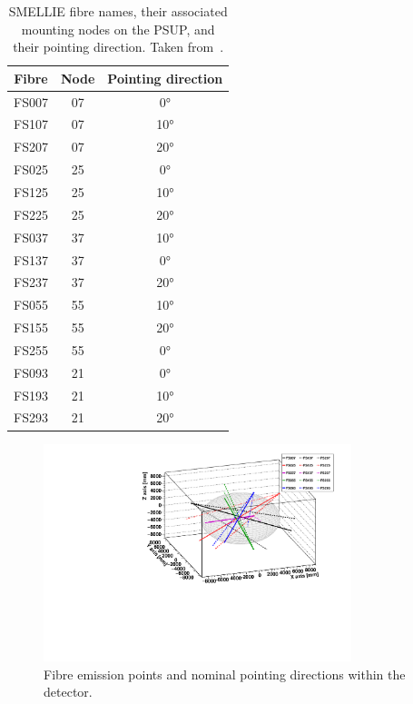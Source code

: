 \begin{table}
    \centering
    \begin{tabular}{c c c}
        \hline
        Fibre   & Node & Pointing direction \\ \hline \hline
        FS007   & 07   & \ang{0}  \\
        FS107   & 07   & \ang{10} \\
        FS207   & 07   & \ang{20} \\
        FS025   & 25   & \ang{0}  \\
        FS125   & 25   & \ang{10} \\
        FS225   & 25   & \ang{20} \\
        FS037   & 37   & \ang{10} \\
        FS137   & 37   & \ang{0}  \\
        FS237   & 37   & \ang{20} \\
        FS055   & 55   & \ang{10} \\
        FS155   & 55   & \ang{20} \\
        FS255   & 55   & \ang{0}  \\
        FS093   & 21   & \ang{0}  \\
        FS193   & 21   & \ang{10} \\
        FS293   & 21   & \ang{20} \\
        \hline
    \end{tabular}
    \caption[SMELLIE fibre names, their associated mounting nodes on the PSUP, and their pointing direction.]
    {SMELLIE fibre names, their associated mounting nodes on the PSUP, and their pointing direction. Taken from~\cite{turnerMeasurementScatteringCharacteristics2022}.}
    \label{tab:smellie_fibre_labellings}
\end{table}

\begin{figure}
    \centering
    \includegraphics[width=0.8\textwidth]{3_SMELLIEHardware/images/fibre_positions.pdf}
    \caption[Fibre emission points and nominal pointing directions]
    {Fibre emission points and nominal pointing directions within the detector.}
    \label{fig:smellie_pos_dirs}
\end{figure}

